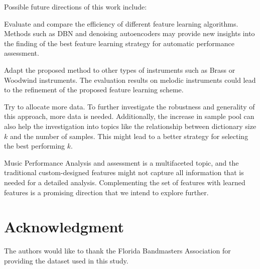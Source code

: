 \documentclass[conference]{IEEEtran}
\begin{document}
Possible future directions of this work include: 
\begin{inparaenum}[(i)]
    \item   Evaluate and compare the efficiency of different feature learning algorithms. Methods such as DBN\cite{Hamel2010} and denoising autoencoders \cite{Vincent2008} may provide new insights into the finding of the best feature learning strategy for automatic performance assessment.
    \item   Adapt the proposed method to other types of instruments such as Brass or Woodwind instruments. The evaluation results on melodic instruments could lead to the refinement of the proposed feature learning scheme. 
    \item   Try to allocate more data. To further investigate the robustness and generality of this approach, more data is needed. Additionally, the increase in sample pool can also help the investigation into topics like the relationship between dictionary size $k$ and the number of samples. This might lead to a better strategy for selecting the best performing $k$. 
\end{inparaenum}

Music Performance Analysis and assessment is a multifaceted topic, and the traditional custom-designed features might not capture all information that is needed for a detailed analysis. Complementing the set of features with learned features is a promising direction that we intend to explore further.



\section*{Acknowledgment}

The authors would like to thank the Florida Bandmasters Association for providing the dataset used in this study.



%
%
%




\end{document}
